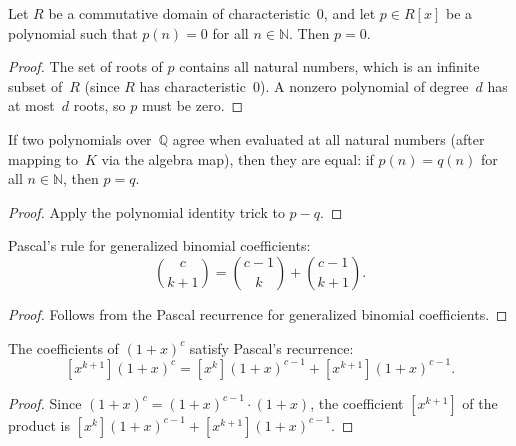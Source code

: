 \begin{theorem}
\label{thm.fps.polynomial-identity-trick}
\leanhelper
\leanok
Let $R$ be a commutative domain of characteristic~$0$,
and let $p\in R[x]$ be a polynomial such that $p(n)=0$ for all $n\in\mathbb{N}$.
Then $p=0$.
\end{theorem}

\begin{proof}
\leanok
The set of roots of $p$ contains all natural numbers, which is an infinite subset
of~$R$ (since $R$ has characteristic~$0$). A nonzero polynomial of degree~$d$
has at most~$d$ roots, so $p$ must be zero.
\end{proof}

\begin{lemma}
\label{lem.fps.poly-eq-of-nat-eval-eq}
\leanhelper
\leanok
If two polynomials over~$\mathbb{Q}$ agree when evaluated at all natural numbers
(after mapping to~$K$ via the algebra map), then they are equal:
if $p(n) = q(n)$ for all $n\in\mathbb{N}$,
then $p = q$.
\end{lemma}

\begin{proof}
Apply the polynomial identity trick to $p - q$.
\end{proof}

\begin{lemma}
\label{lem.fps.Ring-choose-pascal}
\leanhelper
\leanok
Pascal's rule for generalized binomial coefficients:
\[
\binom{c}{k+1} = \binom{c-1}{k} + \binom{c-1}{k+1}.
\]
\end{lemma}

\begin{proof}
Follows from the Pascal recurrence for generalized binomial coefficients.
\end{proof}

\begin{lemma}
\label{lem.fps.fpsPow-coeff-pascal}
\leanhelper
\leanok
The coefficients of $(1+x)^c$ satisfy Pascal's recurrence:
\[
[x^{k+1}](1+x)^c = [x^k](1+x)^{c-1} + [x^{k+1}](1+x)^{c-1}.
\]
\end{lemma}

\begin{proof}
Since $(1+x)^{c} = (1+x)^{c-1}\cdot(1+x)$, the coefficient $[x^{k+1}]$ of the
product is $[x^k](1+x)^{c-1} + [x^{k+1}](1+x)^{c-1}$.
\end{proof}

